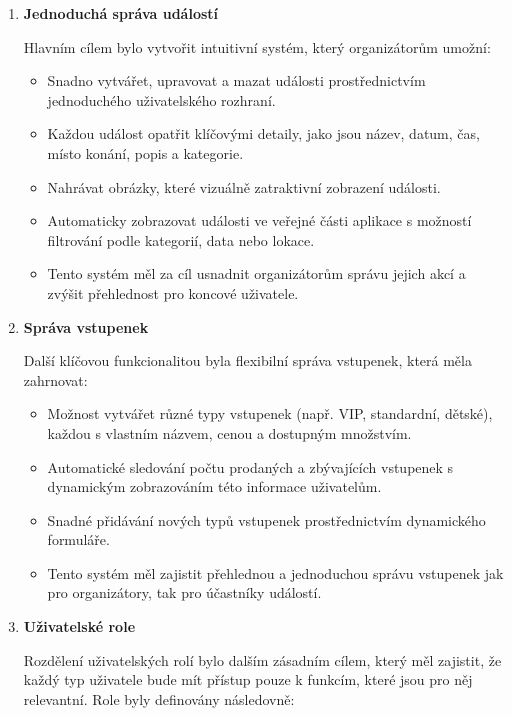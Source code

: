 \documentclass[12pt, a4paper,
twoside,        %
openright
]{report}
\begin{document}
\begin{enumerate}
	\item \textbf{Jednoduchá správa událostí}

Hlavním cílem bylo vytvořit intuitivní systém, který organizátorům umožní:

\begin{itemize}

	\item Snadno vytvářet, upravovat a mazat události prostřednictvím jednoduchého uživatelského rozhraní.
	\item Každou událost opatřit klíčovými detaily, jako jsou název, datum, čas, místo konání, popis a kategorie.
	\item Nahrávat obrázky, které vizuálně zatraktivní zobrazení události.
	\item Automaticky zobrazovat události ve veřejné části aplikace s možností filtrování podle kategorií, data nebo lokace.
	\item Tento systém měl za cíl usnadnit organizátorům správu jejich akcí a zvýšit přehlednost pro koncové uživatele.

\end{itemize}

\item \textbf{Správa vstupenek}

Další klíčovou funkcionalitou byla flexibilní správa vstupenek, která měla zahrnovat:

\begin{itemize}
	
	\item Možnost vytvářet různé typy vstupenek (např. VIP, standardní, dětské), každou s vlastním názvem, cenou a dostupným množstvím.
	\item Automatické sledování počtu prodaných a zbývajících vstupenek s dynamickým zobrazováním této informace uživatelům.
	\item Snadné přidávání nových typů vstupenek prostřednictvím dynamického formuláře.
	\item Tento systém měl zajistit přehlednou a jednoduchou správu vstupenek jak pro organizátory, tak pro účastníky událostí.

\end{itemize}

\item \textbf{Uživatelské role}

Rozdělení uživatelských rolí bylo dalším zásadním cílem, který měl zajistit, že každý typ uživatele bude mít přístup pouze k funkcím, které jsou pro něj relevantní. Role byly definovány následovně:


\end{enumerate}
\end{document}
